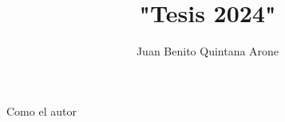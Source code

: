 \documentclass[12pt,a4paper,oneside]{book}
\author{Juan Benito Quintana Arone}
\title{"Tesis 2024"}
\begin{document}
\frontmatter
    
    
    
    \tableofcontents
    \newpage
	\listoftables
	\newpage
	\listoffigures
	\newpage
    
\mainmatter     
    
    
    
    

    
    
    
    
    
    

    Como el autor \cite[6]{Einstein1905}
\backmatter
    \printbibliography[title=BIBLIOGRAFÍA]
	\appendix	
\end{document}
